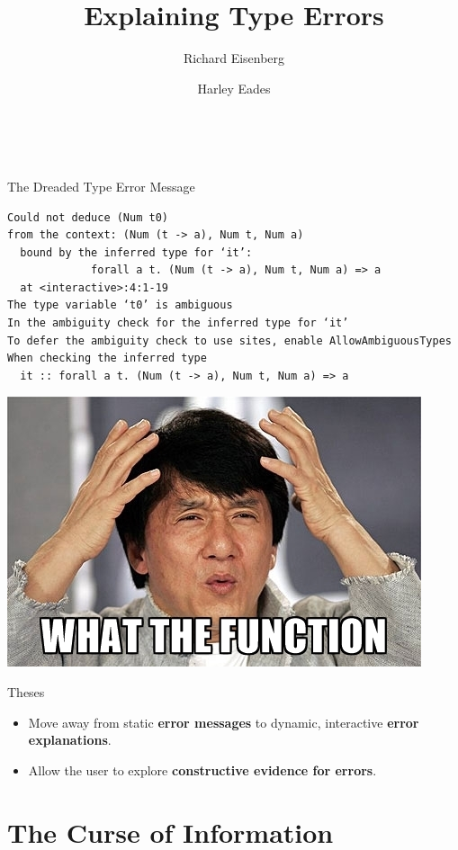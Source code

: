 \documentclass[xcolor=svgnames,12pt,aspectratio=169]{beamer}
\title{Explaining Type Errors}
\date{\theschool \\ \thedate}
\author{\usebeamercolor[fg]{title}{Brent Yorgey} \and Richard
  Eisenberg \and Harley Eades}
\newenvironment{xframe}[1][]
  {\begin{frame}[fragile,environment=xframe,#1]}
  {\end{frame}}
\renewcommand{\emph}{\textbf}
\begin{document}
\begin{xframe}{}
   \titlepage
\end{xframe}

\begin{xframe}{The Dreaded Type Error Message}
\footnotesize
\begin{verbatim}
Could not deduce (Num t0)
from the context: (Num (t -> a), Num t, Num a)
  bound by the inferred type for ‘it’:
             forall a t. (Num (t -> a), Num t, Num a) => a
  at <interactive>:4:1-19
The type variable ‘t0’ is ambiguous
In the ambiguity check for the inferred type for ‘it’
To defer the ambiguity check to use sites, enable AllowAmbiguousTypes
When checking the inferred type
  it :: forall a t. (Num (t -> a), Num t, Num a) => a
\end{verbatim}
\end{xframe}

\begin{xframe}{}
  \begin{center}
    \includegraphics{what-the-function.jpg}
  \end{center}
\end{xframe}

\begin{xframe}{Theses}
  \begin{itemize}
  \item Move away from static \emph{error messages} to dynamic,
    interactive \emph{error explanations}. \medskip
  \item Allow the user to explore \emph{constructive evidence for errors}.
  \end{itemize}
\end{xframe}

\section{The Curse of Information}
\end{document}
